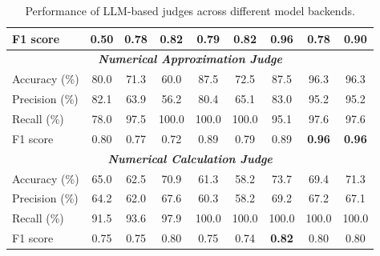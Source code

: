 \begin{table}[htbp]
{\begin{tabular}{l|cccccccc}
    F1 score
      & 0.50 
      & 0.78 
      & 0.82 
      & 0.79 
      & 0.82 
      & \textbf{0.96} 
      & 0.78 
      & 0.90 \\
    \midrule
    \multicolumn{9}{c}{\textit{\textbf{Numerical Approximation Judge}}} \\
    \midrule
    Accuracy (\%)
      & 80.0 & 71.3 & 60.0 & 87.5 & 72.5 & 87.5 & 96.3 & 96.3 \\
    Precision (\%)
      & 82.1 & 63.9 & 56.2 & 80.4 & 65.1 & 83.0 & 95.2 & 95.2 \\
    Recall (\%)
      & 78.0 & 97.5 & 100.0 & 100.0 & 100.0 & 95.1 & 97.6 & 97.6 \\
    \rowcolor{blue!15}
    F1 score
      & 0.80 & 0.77 & 0.72 & 0.89 & 0.79 & 0.89 & \textbf{0.96} & \textbf{0.96} \\
    \midrule
    \multicolumn{9}{c}{\textit{\textbf{Numerical Calculation Judge}}} \\
    \midrule
    Accuracy (\%)
      & 65.0 & 62.5 & 70.9 & 61.3 & 58.2 & 73.7 & 69.4 & 71.3 \\
    Precision (\%)
      & 64.2 & 62.0 & 67.6 & 60.3 & 58.2 & 69.2 & 67.2 & 67.1 \\
    Recall (\%)
      & 91.5 & 93.6 & 97.9 & 100.0 & 100.0 & 100.0 & 100.0 & 100.0 \\
    \rowcolor{blue!15}
    F1 score
      & 0.75 & 0.75 & 0.80 & 0.75 & 0.74 & \textbf{0.82} & 0.80 & 0.80 \\
    \bottomrule
  \end{tabular}%
  }
  \vspace{2mm}
  \caption{Performance of LLM-based judges across different model backends.}
  \label{tab:judge_performance_llms}
\end{table}